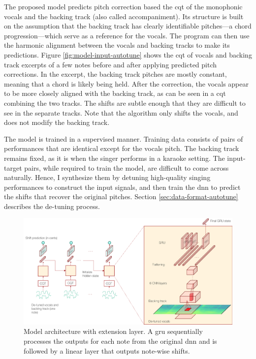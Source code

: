 The proposed model predicts pitch correction based the \gls{cqt} of the monophonic vocals and the backing track (also called accompaniment). Its structure is built on the assumption that the backing track has clearly identifiable pitches---a chord progression---which serve as a reference for the vocals. The program can then use the harmonic alignment between the vocals and backing tracks to make its predictions. Figure \ref{fig:model-input-autotune} shows the \gls{cqt} of vocals and backing track excerpts of a few notes before and after applying predicted pitch corrections. In the excerpt, the backing track pitches are mostly constant, meaning that a chord is likely being held. After the correction, the vocals appear to be more closely aligned with the backing track, as can be seen in a \gls{cqt} combining the two tracks. The shifts are subtle enough that they are difficult to see in the separate tracks. Note that the algorithm only shifts the vocals, and does not modify the backing track. 

The model is trained in a supervised manner. Training data consists of pairs of performances that are identical except for the vocals pitch. The backing track remains fixed, as it is when the singer performs in a karaoke setting. The input-target pairs, while required to train the model, are difficult to come across naturally. Hence, I synthesize them by detuning high-quality singing performances to construct the input signals, and then train the \gls{dnn} to predict the shifts that recover the original pitches. Section \ref{sec:data-format-autotune} describes the de-tuning process.
\begin{figure}[t!]
    \centering
    \includegraphics[width=\columnwidth]{images/model_outline_extension.png}
    \caption{Model architecture with extension layer. A \gls{gru} sequentially processes the outputs for each note from the original \gls{dnn}  and is followed by a linear layer that outputs note-wise shifts.}
    \label{fig:model_outline_extended}
\end{figure}

